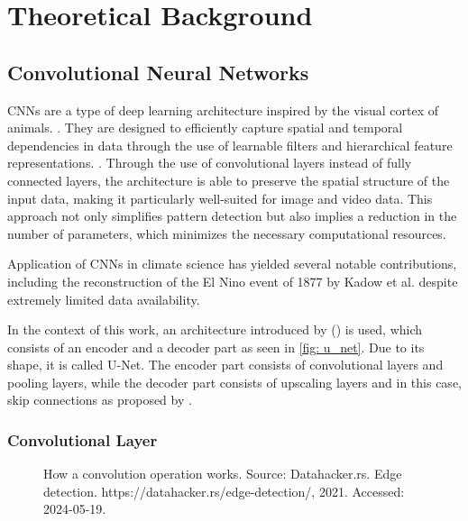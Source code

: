 \section{Theoretical Background}
\label{sec: theory}

\subsection{Convolutional Neural Networks}
\label{subsec:cnn}

CNNs are a type of deep learning architecture inspired by the visual cortex of animals. \cite{Yamashita2018CNN, hubel1968receptive}. They are designed to efficiently capture spatial and temporal dependencies in data through the use of learnable filters and hierarchical feature representations. \cite{Yamashita2018CNN}. Through the use of convolutional layers instead of fully connected layers, the architecture is able to preserve the spatial structure of the input data, making it particularly well-suited for image and video data. This approach not only simplifies pattern detection but also implies a reduction in the number of parameters, which minimizes the necessary computational resources.

Application of CNNs in climate science has yielded several notable contributions, including the reconstruction of the El Nino event of 1877 by Kadow et al. despite extremely limited data availability. \cite{kadow2020}

In the context of this work, an architecture introduced by (\cite{ronneberger2015}) is used, which consists of an encoder and a decoder part as seen in \autoref{fig: u_net}. Due to its shape, it is called U-Net. The encoder part consists of convolutional layers and pooling layers, while the decoder part consists of upscaling layers and in this case, skip connections as proposed by \cite{liu2018inpaining}.

\subsubsection*{Convolutional Layer}
\begin{figure}
    \centering
    \caption{How a convolution operation works. Source: Datahacker.rs. Edge detection. https://datahacker.rs/edge-detection/, 2021.
    Accessed: 2024-05-19.}
    \label{fig: convolution_operation}
\end{figure}

